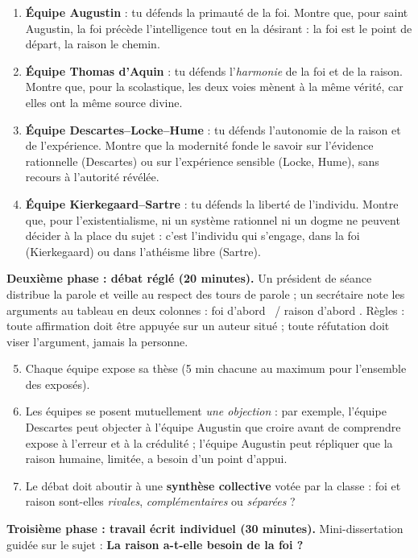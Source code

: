 \documentclass[11pt]{article}
\begin{document}
\begin{enumerate}
\item \textbf{Équipe Augustin} : tu défends la primauté de la foi. Montre que, pour saint Augustin, la foi précède l'intelligence tout en la désirant : la foi est le point de départ, la raison le chemin.
\item \textbf{Équipe Thomas d'Aquin} : tu défends l'\emph{harmonie} de la foi et de la raison. Montre que, pour la scolastique, les deux voies mènent à la même vérité, car elles ont la même source divine.
\item \textbf{Équipe Descartes--Locke--Hume} : tu défends l'autonomie de la raison et de l'expérience. Montre que la modernité fonde le savoir sur l'évidence rationnelle (Descartes) ou sur l'expérience sensible (Locke, Hume), sans recours à l'autorité révélée.
\item \textbf{Équipe Kierkegaard--Sartre} : tu défends la liberté de l'individu. Montre que, pour l'existentialisme, ni un système rationnel ni un dogme ne peuvent décider à la place du sujet : c'est l'individu qui s'engage, dans la foi (Kierkegaard) ou dans l'athéisme libre (Sartre).
\end{enumerate}

\textbf{Deuxième phase : débat réglé (20 minutes).} Un président de séance distribue la parole et veille au respect des tours de parole ; un secrétaire note les arguments au tableau en deux colonnes : \guillemotleft foi d'abord \guillemotright\ / \guillemotleft raison d'abord \guillemotright. Règles : toute affirmation doit être appuyée sur un auteur situé ; toute réfutation doit viser l'argument, jamais la personne.

\begin{enumerate}
\setcounter{enumi}{4}
\item Chaque équipe expose sa thèse (5 min chacune au maximum pour l'ensemble des exposés).
\item Les équipes se posent mutuellement \emph{une objection} : par exemple, l'équipe Descartes peut objecter à l'équipe Augustin que croire avant de comprendre expose à l'erreur et à la crédulité ; l'équipe Augustin peut répliquer que la raison humaine, limitée, a besoin d'un point d'appui.
\item Le débat doit aboutir à une \textbf{synthèse collective} votée par la classe : foi et raison sont-elles \emph{rivales}, \emph{complémentaires} ou \emph{séparées} ?
\end{enumerate}

\textbf{Troisième phase : travail écrit individuel (30 minutes).} Mini-dissertation guidée sur le sujet : \textbf{\guillemotleft La raison a-t-elle besoin de la foi ? \guillemotright}
\end{document}
